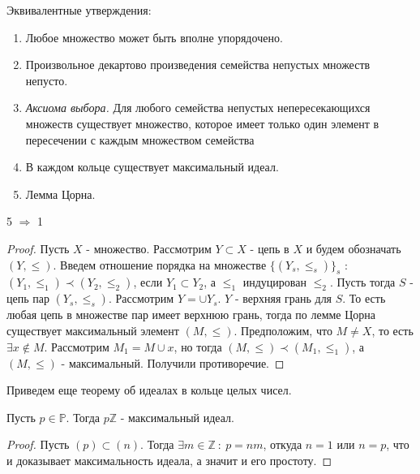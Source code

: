 \pagebreak

Эквивалентные утверждения:

\begin{enumerate}
  \item Любое множество может быть вполне упорядочено.
  \item Произвольное декартово произведения семейства непустых множеств непусто. 
  \item \emph{Аксиома выбора.} Для любого семейства непустых непересекающихся множеств существует множество, которое имеет
        только один элемент в пересечении с каждым множеством семейства
  \item В каждом кольце существует максимальный идеал.
  \item Лемма Цорна.
\end{enumerate}

\begin{thm}
  5 $ \Rightarrow $ 1
\end{thm}

\begin{proof}
  Пусть $ X $ - множество. Рассмотрим $ Y \subset X $ - цепь в $ X $ 
  и будем обозначать $ (Y, \le) $. Введем отношение порядка
  на множестве $ \{ (Y_{s}, \le_{s}) \}_s $ : $ (Y_{1}, \le_{1}) \prec (Y_{2}, \le_{2}) $, если $ Y_{1} \subset Y_{2} $, а $ \le_{1} $ индуцирован 
  $ \le_{2} $.
  Пусть тогда $ S $ - цепь пар $ (Y_{s}, \le_{s}) $. Рассмотрим $ Y = \cup{Y_{s}} $. $ Y $ - верхняя грань для $ S $. То есть любая цепь
  в множестве пар имеет верхнюю грань, тогда по лемме Цорна существует максимальный элемент $ (M, \le) $. Предположим, что $ M \ne X $, то есть
  $ \exists x \notin M $. Рассмотрим $ M_{1} = M \cup {x} $, но тогда $ (M, \le) \prec (M_{1}, \le_{1}) $, а $ (M, \le) $ - максимальный. Получили
  противоречие.
\end{proof}

Приведем еще теорему об идеалах в кольце целых чисел.

\begin{thm}
  Пусть $ p \in \mathbb{P} $. Тогда $ p\mathbb{Z} $ - максимальный идеал. 
\end{thm}

\begin{proof}
  Пусть $ (p) \subset (n) $. Тогда $ \exists m \in \mathbb{Z} ~ : ~ p = nm $, откуда
  $ n = 1 $ или $ n = p $, что и доказывает максимальность идеала, а значит и его простоту.
\end{proof}

